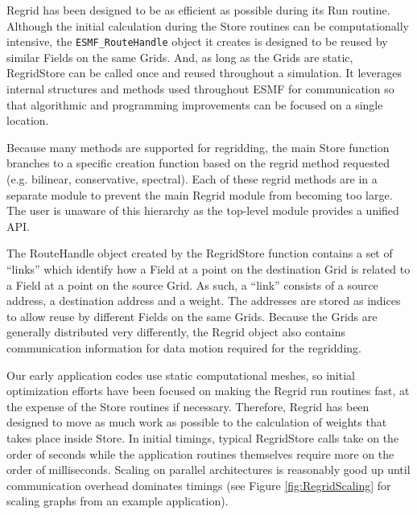 


Regrid has been designed to be as efficient as possible during its
Run routine.  Although the initial calculation during the Store routines
can be computationally intensive, the {\tt ESMF\_RouteHandle} object
it creates is designed to be reused by similar Fields on the same Grids.
And, as long as the Grids are static, RegridStore can be called once
and reused throughout a simulation.  It leverages internal structures
and methods used throughout ESMF for communication so that algorithmic
and programming improvements can be focused on a single location.

Because many methods are supported for regridding, the main Store function
branches to a specific creation function based on the regrid method requested
(e.g. bilinear, conservative, spectral).  Each of these regrid methods are in
a separate module to prevent the main Regrid module from becoming too
large.  The user is unaware of this hierarchy as the top-level module provides
a unified API.

The RouteHandle object created by the RegridStore function contains a set of
``links'' which identify how a Field at a point on the destination Grid is
related to a Field at a point on the source Grid.  As such, a ``link''
consists of a source address, a destination address and a weight.  The addresses
are stored as indices to allow reuse by different Fields on the same Grids.
Because the Grids are generally distributed very differently, the Regrid object
also contains communication information for data motion required for the
regridding.

Our early application codes use static computational meshes, so initial 
optimization efforts have been focused on making the Regrid run routines 
fast, at the expense of the Store routines if necessary.  Therefore, Regrid
has been designed to move as much work as possible to the calculation of weights
that takes place inside Store.  In initial timings, typical RegridStore calls
take on the order of seconds while the application routines themselves require
more on the order of milliseconds.  Scaling on parallel architectures is
reasonably good up until communication overhead dominates timings (see 
Figure \ref{fig:RegridScaling} for scaling graphs from an example application).


